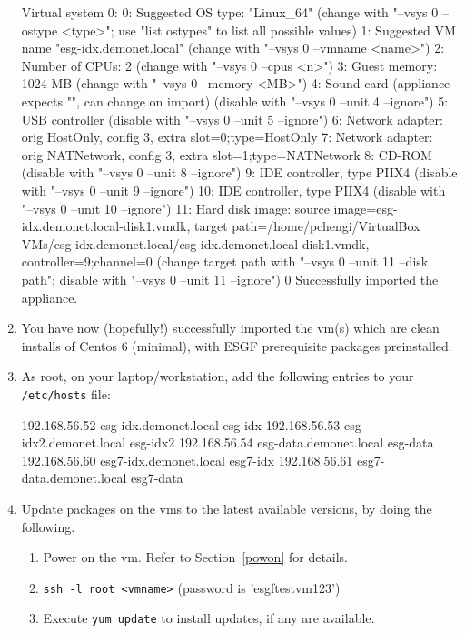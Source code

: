 \begin{enumerate}
\begin{tiny}
\begin{verbatimtab}[4]
Virtual system 0:
 0: Suggested OS type: "Linux_64"
    (change with "--vsys 0 --ostype <type>"; use "list ostypes" to list all possible values)
 1: Suggested VM name "esg-idx.demonet.local"
    (change with "--vsys 0 --vmname <name>")
 2: Number of CPUs: 2
    (change with "--vsys 0 --cpus <n>")
 3: Guest memory: 1024 MB
    (change with "--vsys 0 --memory <MB>")
 4: Sound card (appliance expects "", can change on import)
    (disable with "--vsys 0 --unit 4 --ignore")
 5: USB controller
    (disable with "--vsys 0 --unit 5 --ignore")
 6: Network adapter: orig HostOnly, config 3, extra slot=0;type=HostOnly
 7: Network adapter: orig NATNetwork, config 3, extra slot=1;type=NATNetwork
 8: CD-ROM
    (disable with "--vsys 0 --unit 8 --ignore")
 9: IDE controller, type PIIX4
    (disable with "--vsys 0 --unit 9 --ignore")
10: IDE controller, type PIIX4
    (disable with "--vsys 0 --unit 10 --ignore")
11: Hard disk image: source image=esg-idx.demonet.local-disk1.vmdk, 
target path=/home/pchengi/VirtualBox VMs/esg-idx.demonet.local/esg-idx.demonet.local-disk1.vmdk, 
controller=9;channel=0
    (change target path with "--vsys 0 --unit 11 --disk path";
    disable with "--vsys 0 --unit 11 --ignore")
0%
Successfully imported the appliance.
\end{verbatimtab}
\end{tiny}
\item You have now (hopefully!) successfully imported the vm(s) which are clean installs of Centos 6 (minimal), with ESGF prerequisite packages preinstalled.
\item As root, on your laptop/workstation, add the following entries to your \texttt{/etc/hosts} file:
\begin{verbatimtab}[4]
192.168.56.52   esg-idx.demonet.local   esg-idx
192.168.56.53   esg-idx2.demonet.local  esg-idx2
192.168.56.54   esg-data.demonet.local   esg-data
192.168.56.60   esg7-idx.demonet.local  esg7-idx
192.168.56.61   esg7-data.demonet.local esg7-data
\end{verbatimtab}
\item Update packages on the vms to the latest available versions, by doing the following.
\begin{enumerate}
\item Power on the vm. Refer to Section~\ref{powon} for details.
\item \texttt{ssh -l root <vmname>} (password is 'esgftestvm123')
\item Execute  \texttt{yum update} to install updates, if any are available.

\end{enumerate}
\end{enumerate}
